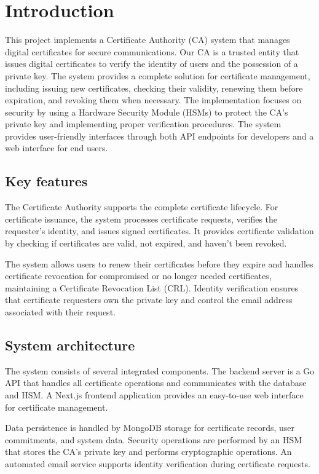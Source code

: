 \chapter{Introduction}
\label{ch:introduction}
This project implements a Certificate Authority (CA) system that manages digital certificates for 
secure communications. Our CA is a trusted entity that issues digital certificates to verify the identity 
of users and the possession of a private key.
The system provides a complete solution for certificate management, including issuing new certificates, 
checking their validity, renewing them before expiration, and revoking them when necessary. 
The implementation focuses on security by using a Hardware Security Module (HSMs) to protect
the CA's private key and implementing proper verification procedures.
The system provides user-friendly interfaces through both API endpoints for developers and a web 
interface for end users. 

\section{Key features}

The Certificate Authority supports the complete certificate lifecycle. 
For certificate issuance, the system processes certificate requests, verifies the requester's identity, 
and issues signed certificates. 
It provides certificate validation by checking if certificates are valid, not expired, and haven't been revoked.

The system allows users to renew their certificates before they expire and handles certificate revocation 
for compromised or no longer needed certificates, maintaining a Certificate Revocation List (CRL). 
Identity verification ensures that certificate requesters own the private key and control the email 
address associated with their request.

\section{System architecture}

The system consists of several integrated components. The backend server is a Go API that handles 
all certificate operations and communicates with the database and HSM. 
A Next.js frontend application provides an easy-to-use web interface for certificate management.

Data persistence is handled by MongoDB storage for certificate records, user commitments, and system data. 
Security operations are performed by an HSM that stores the CA's private key 
and performs cryptographic operations. 
An automated email service supports identity verification during certificate requests.

